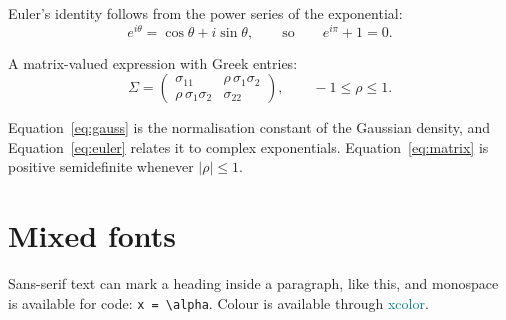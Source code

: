 \documentclass[11pt,a4paper]{article}
\begin{document}
Euler's identity follows from the power series of the exponential:
\begin{equation}\label{eq:euler}
  e^{i\theta} = \cos\theta + i\sin\theta,
  \qquad\text{so}\qquad
  e^{i\pi} + 1 = 0.
\end{equation}

A matrix-valued expression with Greek entries:
\begin{equation}\label{eq:matrix}
  \Sigma =
  \begin{pmatrix}
    \sigma_{11} & \rho\,\sigma_1\sigma_2 \\
    \rho\,\sigma_1\sigma_2 & \sigma_{22}
  \end{pmatrix},
  \qquad -1 \le \rho \le 1.
\end{equation}

Equation~\eqref{eq:gauss} is the normalisation constant of the Gaussian density,
and Equation~\eqref{eq:euler} relates it to complex exponentials.
Equation~\eqref{eq:matrix} is positive semidefinite whenever $|\rho| \le 1$.

\section{Mixed fonts}

Sans-serif text can mark a heading inside a paragraph, \textsf{like this},
and monospace is available for code: \texttt{x = \textbackslash alpha}.
Colour is available through \textcolor{teal}{xcolor}.
\end{document}
